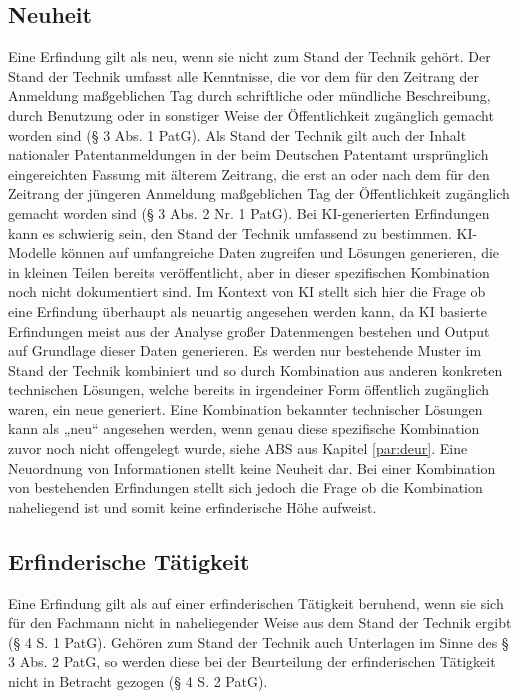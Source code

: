 \subsection{Neuheit}
Eine Erfindung gilt als neu, wenn sie nicht zum Stand der Technik gehört. 
Der Stand der Technik umfasst alle Kenntnisse, 
die vor dem für den Zeitrang der Anmeldung
maßgeblichen Tag durch schriftliche 
oder mündliche Beschreibung, durch Benutzung oder in
sonstiger Weise der Öffentlichkeit zugänglich gemacht worden sind (§ 3 Abs. 1 PatG).
Als Stand der Technik gilt auch der Inhalt nationaler Patentanmeldungen 
in der beim Deutschen
Patentamt ursprünglich eingereichten Fassung mit älterem Zeitrang, 
die erst an oder nach dem für
den Zeitrang der jüngeren Anmeldung maßgeblichen Tag der Öffentlichkeit 
zugänglich gemacht
worden sind (§ 3 Abs. 2 Nr. 1 PatG). 
Bei KI-generierten Erfindungen kann es schwierig sein, 
den Stand der Technik umfassend zu bestimmen. 
KI-Modelle können auf umfangreiche Daten zugreifen und Lösungen generieren, 
die in kleinen Teilen bereits veröffentlicht, 
aber in dieser spezifischen Kombination noch nicht dokumentiert sind.
Im Kontext von KI stellt sich hier die Frage 
ob eine Erfindung überhaupt als neuartig angesehen werden kann, 
da KI basierte Erfindungen meist aus der Analyse großer Datenmengen bestehen
und Output auf Grundlage dieser Daten generieren. 
Es werden nur bestehende Muster im Stand der Technik kombiniert 
und so durch Kombination aus anderen konkreten technischen Lösungen, 
welche bereits in irgendeiner Form öffentlich zugänglich waren, ein neue generiert.
Eine Kombination bekannter technischer Lösungen kann als „neu“ angesehen werden,
wenn genau diese spezifische Kombination zuvor noch nicht offengelegt wurde,
siehe ABS aus Kapitel \ref{par:deur}.
Eine Neuordnung von Informationen stellt keine Neuheit dar.
Bei einer Kombination von 
bestehenden Erfindungen stellt sich jedoch die Frage 
ob die Kombination naheliegend ist und
somit keine erfinderische Höhe aufweist. 

\subsection{Erfinderische Tätigkeit}


Eine Erfindung gilt als auf einer erfinderischen Tätigkeit beruhend, 
wenn sie sich für den Fachmann
nicht in naheliegender Weise aus dem Stand der Technik ergibt (§ 4 S. 1 PatG). 
Gehören zum Stand
der Technik auch Unterlagen im Sinne des § 3 Abs. 2 PatG, 
so werden diese bei der Beurteilung der
erfinderischen Tätigkeit nicht in Betracht gezogen (§ 4 S. 2 PatG).

